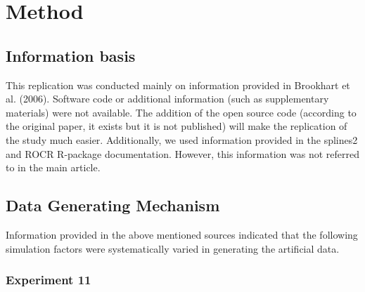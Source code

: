\documentclass[10,a4paperpaper,]{article}
\begin{document}
\section{Method}

\subsection{Information basis}

This replication was conducted mainly on information provided in
Brookhart et al. (2006). Software code or additional information (such
as supplementary materials) were not available. The addition of the open
source code (according to the original paper, it exists but it is not
published) will make the replication of the study much easier.
Additionally, we used information provided in the splines2 and ROCR
R-package documentation. However, this information was not referred to
in the main article.

\subsection{Data Generating Mechanism}

Information provided in the above mentioned sources indicated that the
following simulation factors were systematically varied in generating
the artificial data.

\subsubsection{Experiment 11}
\end{document}
